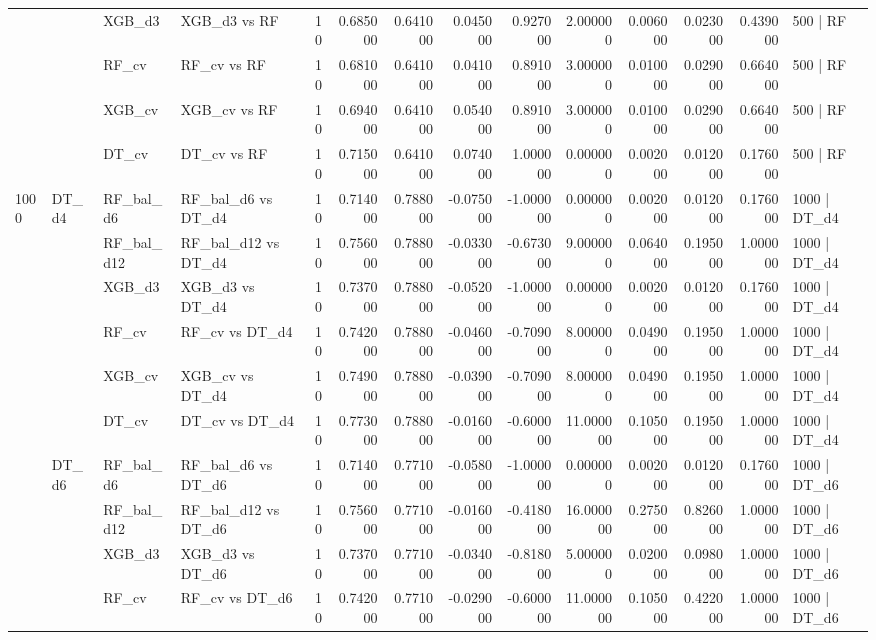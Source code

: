 \begin{tabular}{llllrrrrrrrrrl}
 &  & XGB_d3 & XGB_d3 vs RF & 10 & 0.685000 & 0.641000 & 0.045000 & 0.927000 & 2.000000 & 0.006000 & 0.023000 & 0.439000 & 500 | RF \\
 &  & RF_cv & RF_cv vs RF & 10 & 0.681000 & 0.641000 & 0.041000 & 0.891000 & 3.000000 & 0.010000 & 0.029000 & 0.664000 & 500 | RF \\
 &  & XGB_cv & XGB_cv vs RF & 10 & 0.694000 & 0.641000 & 0.054000 & 0.891000 & 3.000000 & 0.010000 & 0.029000 & 0.664000 & 500 | RF \\
 &  & DT_cv & DT_cv vs RF & 10 & 0.715000 & 0.641000 & 0.074000 & 1.000000 & 0.000000 & 0.002000 & 0.012000 & 0.176000 & 500 | RF \\
\cline{1-14} \cline{2-14}
\multirow[t]{18}{*}{1000} & \multirow[t]{6}{*}{DT_d4} & RF_bal_d6 & RF_bal_d6 vs DT_d4 & 10 & 0.714000 & 0.788000 & -0.075000 & -1.000000 & 0.000000 & 0.002000 & 0.012000 & 0.176000 & 1000 | DT_d4 \\
 &  & RF_bal_d12 & RF_bal_d12 vs DT_d4 & 10 & 0.756000 & 0.788000 & -0.033000 & -0.673000 & 9.000000 & 0.064000 & 0.195000 & 1.000000 & 1000 | DT_d4 \\
 &  & XGB_d3 & XGB_d3 vs DT_d4 & 10 & 0.737000 & 0.788000 & -0.052000 & -1.000000 & 0.000000 & 0.002000 & 0.012000 & 0.176000 & 1000 | DT_d4 \\
 &  & RF_cv & RF_cv vs DT_d4 & 10 & 0.742000 & 0.788000 & -0.046000 & -0.709000 & 8.000000 & 0.049000 & 0.195000 & 1.000000 & 1000 | DT_d4 \\
 &  & XGB_cv & XGB_cv vs DT_d4 & 10 & 0.749000 & 0.788000 & -0.039000 & -0.709000 & 8.000000 & 0.049000 & 0.195000 & 1.000000 & 1000 | DT_d4 \\
 &  & DT_cv & DT_cv vs DT_d4 & 10 & 0.773000 & 0.788000 & -0.016000 & -0.600000 & 11.000000 & 0.105000 & 0.195000 & 1.000000 & 1000 | DT_d4 \\
\cline{2-14}
 & \multirow[t]{6}{*}{DT_d6} & RF_bal_d6 & RF_bal_d6 vs DT_d6 & 10 & 0.714000 & 0.771000 & -0.058000 & -1.000000 & 0.000000 & 0.002000 & 0.012000 & 0.176000 & 1000 | DT_d6 \\
 &  & RF_bal_d12 & RF_bal_d12 vs DT_d6 & 10 & 0.756000 & 0.771000 & -0.016000 & -0.418000 & 16.000000 & 0.275000 & 0.826000 & 1.000000 & 1000 | DT_d6 \\
 &  & XGB_d3 & XGB_d3 vs DT_d6 & 10 & 0.737000 & 0.771000 & -0.034000 & -0.818000 & 5.000000 & 0.020000 & 0.098000 & 1.000000 & 1000 | DT_d6 \\
 &  & RF_cv & RF_cv vs DT_d6 & 10 & 0.742000 & 0.771000 & -0.029000 & -0.600000 & 11.000000 & 0.105000 & 0.422000 & 1.000000 & 1000 | DT_d6 \\

\end{tabular}
